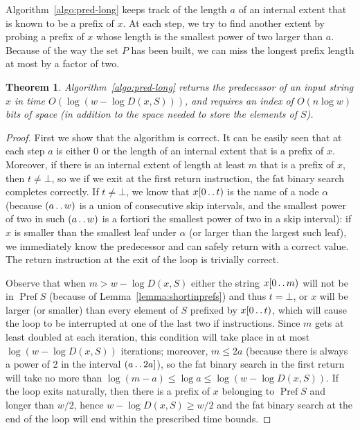 \documentclass[a4paper,11pt]{article}
\newtheorem{theorem}{Theorem}[section]
\newcommand{\?}{\mskip1.5mu}
\def\..{\,\mathpunct{\ldotp\ldotp}} %
\DeclareMathOperator{\Pref}{Pref}
\begin{document}
Algorithm~\ref{algo:pred-long} keeps track of the length $a$ of an
internal extent that is known to be a prefix of $x$. At each step, we try to
find another extent by probing a prefix of $x$ whose length is the smallest power of two larger than
$a$. Because of the way the set $P$ has been built, we can miss the longest
prefix length at most by a factor of two. 

\begin{theorem}	
\label{thm:pred-long}
Algorithm~\ref{algo:pred-long} returns the predecessor of an input string $x$
in time $O(\log(w-\log D(x,S)))$, and requires an index of $O(n \log w)$ bits of space (in addition to the space needed to store the elements of $S$).
\end{theorem}
\begin{proof}
First we show that the algorithm is correct. It can be easily seen that at each
step $a$ is either 0 or the length of an internal extent that is a prefix of
$x$. Moreover, if there is an internal extent of length at least $m$ that is
a prefix of $x$, then $t\neq\bot$, so we if we exit at the first return
instruction, the fat binary search completes correctly. If $t\neq \bot$,
we know that $x[0\..t)$ is the name of a node $\alpha$
(because $(a\..w)$ is a union of consecutive skip intervals, and the smallest power of two in such $(a\..w)$ is
a fortiori the smallest power of two in a skip interval): if  
$x$ is smaller than the smallest leaf
under $\alpha$ (or larger than the largest such leaf), we immediately know the
predecessor and can safely return with a correct value. The return instruction
at the exit of the loop is trivially correct.

Observe that when $m>w-\log D(x,S)$
either the string $x[0\..m)$ will not be in $\Pref S$ (because of
Lemma~\ref{lemma:shortinprefs}) and thus $t=\bot$, or $x$ will be larger (or
smaller) than every element of $S$ prefixed by $x[0\..t)$, which will cause the
loop to be interrupted at one of the last two if instructions. 
Since $m$ gets at
least doubled at each iteration, this condition will take place in at most $\log(w-\log D(x,S))$ iterations; moreover, $m\leq 2a$ (because there is always a power of 2 in the interval $(a\..2a]$), so the fat binary search in the first
return will take no more than $\log(m-a)\leq \log a\leq \log (w-\log D(x,S))$.
If the loop exits naturally, then there is a prefix of $x$ belonging to $\Pref
S$ and longer than $w/2$, hence $w-\log D(x,S)\geq w/2$ and the fat binary
search at the end of the loop will end within the prescribed time bounds.
\end{proof}
\end{document}
